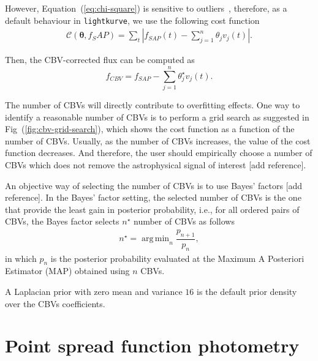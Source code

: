 \documentclass[twocolumn]{aastex62}
\newcommand{\lightkurve}{\texttt{lightkurve}}
\DeclareMathOperator*{\argmin}{arg\,min}
\begin{document}
However, Equation~(\ref{eq:chi-square}) is sensitive to outliers~\cite{ivezi2014},
therefore, as a default behaviour in \lightkurve, we use the following cost
function
\begin{align}
    \mathcal{C}(\bm{\theta}, f_SAP) = \sum_{t} \left\rvert f_{SAP}(t)
    - \sum_{j=1}^{n}\theta_j v_{j}(t)\right\rvert.
\label{eq:l1-norm}
\end{align}


Then, the CBV-corrected flux can be computed as
\begin{equation}
    f_{CBV} = f_{SAP} - \sum_{j=1}^{n}\theta^{\star}_j v_{j}(t).
\end{equation}


The number of CBVs will directly contribute to overfitting effects. One
way to identify a reasonable number of CBVs is to perform a grid search
as suggested in Fig~(\ref{fig:cbv-grid-search}), which shows the cost
function as a function of the number of CBVs. Usually, as the number of
CBVs increases, the value of the cost function decreases. And therefore,
the user should empirically choose a number of CBVs which does not
remove the astrophysical signal of interest [add reference].



An objective way of selecting the number of CBVs is to use Bayes' factors
[add reference]. In the Bayes' factor setting, the selected number of
CBVs is the one that provide the least gain in posterior probability, i.e.,
for all ordered pairs of CBVs, the Bayes factor selects $n^{\star}$ number of CBVs
as follows
\begin{align}
    n^{\star} = \argmin_{n} \dfrac{p_{n+1}}{p_n},
\end{align}
in which $p_n$ is the posterior probability evaluated at the Maximum A Posteriori
Estimator (MAP) obtained using $n$ CBVs.

A Laplacian prior with zero mean and variance $16$ is the default prior
density over the CBVs coefficients.

\section{Point spread function photometry}
\label{appendix:psf}
\end{document}
